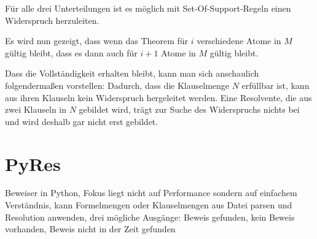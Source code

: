 Für alle drei Unterteilungen ist es möglich mit Set-Of-Support-Regeln einen Widerspruch herzuleiten.

Es wird nun gezeigt, dass wenn das Theorem für $i$ verschiedene Atome in $M$ gültig bleibt, dass es dann auch für $i+1$ Atome in $M$ gültig bleibt.



Dass die Vollständigkeit erhalten bleibt, kann man sich anschaulich folgendermaßen vorstellen: Dadurch, dass die Klauselmenge $N$ erfüllbar ist, kann aus ihren Klauseln kein Widerspruch hergeleitet werden. Eine Resolvente, die aus zwei Klauseln in $N$ gebildet wird, trägt zur Suche des Widerspruchs nichts bei und wird deshalb gar nicht erst gebildet.
		
	\section{PyRes}
Beweiser in Python, Fokus liegt nicht auf Performance sondern auf einfachem Verständnis, kann Formelmengen oder Klauselmengen aus Datei parsen und Resolution anwenden, drei mögliche Ausgänge: Beweis gefunden, kein Beweis vorhanden, Beweis nicht in der Zeit gefunden